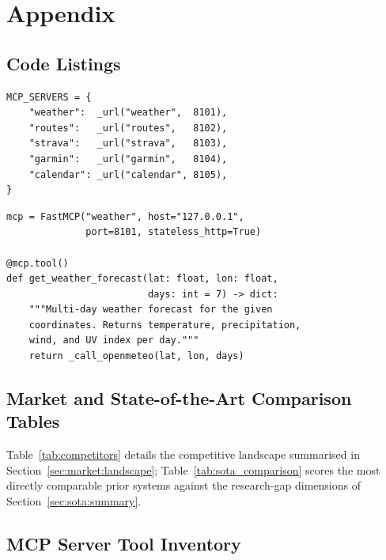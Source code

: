 \section{Appendix}
\label{sec:appendix}

\FloatBarrier
\subsection{Code Listings}\label{sec:appendix:code}

\begin{lstlisting}[caption={Server registry (simplified). Each URL is environment-overridable.}, label=lst:registry]
MCP_SERVERS = {
    "weather":  _url("weather",  8101),
    "routes":   _url("routes",   8102),
    "strava":   _url("strava",   8103),
    "garmin":   _url("garmin",   8104),
    "calendar": _url("calendar", 8105),
}
\end{lstlisting}

\begin{lstlisting}[caption={Server implementation pattern (simplified).}, label=lst:server_pattern]
mcp = FastMCP("weather", host="127.0.0.1",
              port=8101, stateless_http=True)

@mcp.tool()
def get_weather_forecast(lat: float, lon: float,
                         days: int = 7) -> dict:
    """Multi-day weather forecast for the given
    coordinates. Returns temperature, precipitation,
    wind, and UV index per day."""
    return _call_openmeteo(lat, lon, days)
\end{lstlisting}

\FloatBarrier
\subsection{Market and State-of-the-Art Comparison Tables}\label{sec:appendix:comparisons}

Table~\ref{tab:competitors} details the competitive landscape summarised in Section~\ref{sec:market:landscape}; Table~\ref{tab:sota_comparison} scores the most directly comparable prior systems against the research-gap dimensions of Section~\ref{sec:sota:summary}.





\FloatBarrier
\subsection{MCP Server Tool Inventory}\label{sec:appendix:tools}

